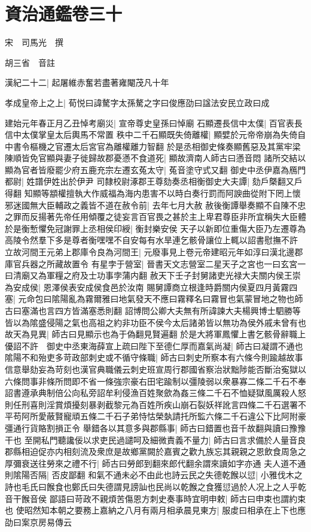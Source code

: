 \chapter{資治通鑑卷三十}
宋　司馬光　撰

胡三省　音註

漢紀二十二|{
	起屠維赤奮若盡著雍閹茂凡十年}


孝成皇帝上之上|{
	荀悦曰諱驁字太孫驁之字曰俊應劭曰諡法安民立政曰成}


建始元年春正月乙丑悼考廟災|{
	宣帝尊史皇孫曰悼廟}
石顯遷長信中太僕|{
	百官表長信中太僕掌皇太后輿馬不常置}
秩中二千石顯既失倚離權|{
	顯嬖於元帝帝崩為失倚自中書令樞機之官遷太后宮官為離權離力智翻}
於是丞相御史條奏顯舊惡及其黨牢梁陳順皆免官顯與妻子徙歸故郡憂懣不食道死|{
	顯故濟南人師古曰懣音悶}
諸所交結以顯為官者皆廢罷少府五鹿充宗左遷玄菟太守|{
	菟音塗守式又翻}
御史中丞伊嘉為鴈門都尉|{
	姓譜伊姓出於伊尹}
司隸校尉涿郡王尊劾奏丞相衡御史大夫譚|{
	劾戶槩翻又戶得翻}
知顯等顓權擅執大作威福為海内患害不以時白奏行罰而阿諛曲從附下罔上懷邪迷國無大臣輔政之義皆不道在赦令前|{
	去年七月大赦}
赦後衡譚舉奏顯不自陳不忠之罪而反揚著先帝任用傾覆之徒妄言百官畏之甚於主上卑君尊臣非所宜稱失大臣體於是衡慙懼免冠謝罪上丞相侯印綬|{
	衡封樂安侯}
天子以新即位重傷大臣乃左遷尊為高陵令然羣下多是尊者衡嘿嘿不自安每有水旱連乞骸骨讓位上輒以詔書慰撫不許　立故河間王元弟上郡庫令良為河間王|{
	元廢事見上卷元帝建昭元年如淳曰漢北邊郡庫官兵器之所藏故置令}
有星孛于營室|{
	晉書天文志營室二星天子之宮也一曰玄宮一曰清廟又為軍糧之府及士功事孛蒲内翻}
赦天下壬子封舅諸吏光禄大夫關内侯王崇為安成侯|{
	恩澤侯表安成侯食邑於汝南}
賜舅譚商立根逢時爵關内侯夏四月黃霧四塞|{
	元命包曰隂陽亂為霧爾雅曰地氣發天不應曰霧釋名曰霧冒也氣蒙冒地之物也師古曰塞滿也言四方皆滿塞悉則翻}
詔博問公卿大夫無有所諱諫大夫楊興博士駟勝等皆以為隂盛侵陽之氣也高祖之約非功臣不侯今太后諸弟皆以無功為侯外戚未曾有也故天為見異|{
	師古曰見顯示也為于偽翻見賢遍翻}
於是大將軍鳳懼上書乞骸骨辭職上優詔不許　御史中丞東海薛宣上疏曰陛下至德仁厚而嘉氣尚凝|{
	師古曰凝謂不通也}
隂陽不和殆吏多苛政部刺史或不循守條職|{
	師古曰刺史所察本有六條今則踰越故事信意舉劾妄為苛刻也漢官典職儀云刺史班宣周行郡國省察治狀黜陟能否斷治寃獄以六條問事非條所問即不省一條強宗豪右田宅踰制以彊陵弱以衆暴寡二條二千石不奉詔書遵承典制倍公向私旁詔牟利侵漁百姓聚歛為姦三條二千石不恤疑獄風厲殺人怒則任刑喜則淫賞煩擾刻暴剥截黎元為百姓所疾山崩石裂妖祥訛言四條二千石選署不平苟阿所愛蔽賢寵頑五條二千石子弟恃怙榮埶請托所監六條二千石違公下比阿附豪彊通行貨賂割損正令}
舉錯各以其意多與郡縣事|{
	師古曰錯置也音千故翻與讀曰豫豫干也}
至開私門聽讒佞以求吏民過譴呵及細微責義不量力|{
	師古曰言求備於人量音良}
郡縣相迫促亦内相刻流及衆庶是故鄉黨闕於嘉賓之歡九族忘其親親之恩飲食周急之厚彌衰送往勞來之禮不行|{
	師古曰勞郎到翻來郎代翻余謂來讀如字亦通}
夫人道不通則隂陽否隔|{
	否皮鄙翻}
和氣不通未必不由此也詩云民之失德乾餱以愆|{
	小雅伐木之詩也毛氏曰餱食也鄭氏曰失德謂見謗訕也民尚以乾餱之食獲愆過於人况上之人乎乾音干餱音侯}
鄙語曰苛政不親煩苦傷恩方刺史奏事時宜明申敕|{
	師古曰申束也謂約束也}
使昭然知本朝之要務上嘉納之八月有兩月相承晨見東方|{
	服䖍曰相承在上下也應劭曰案京房易傳云}


